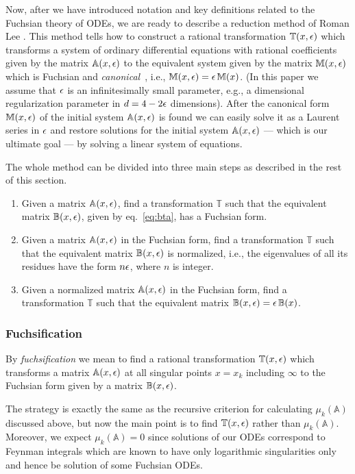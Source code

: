 \documentclass[12pt,a4paper]{article}
\def\M#1{\mathbb{#1}} %
\begin{document}
Now, after we have introduced notation and key definitions related to the Fuchsian theory of ODEs, we are ready to describe a reduction method of Roman Lee \cite{Lee15}.
This method tells how to construct a rational transformation $\M T(x,\eps)$ which transforms a system of ordinary differential equations with rational coefficients given by the matrix $\M A(x,\eps)$ to the equivalent system given by the matrix $\M M(x,\eps)$ which is Fuchsian and {\em canonical}~\cite{Henn13}, i.e., $\M M(x,\eps) = \eps\, \M M(x)$.
(In this paper we assume that $\epsilon$ is an infinitesimally small parameter, e.g., a dimensional regularization parameter in $d=4-2\epsilon$ dimensions).
After the canonical form $\M M(x,\eps)$ of the initial system $\M A(x,\eps)$ is found we can easily solve it as a Laurent series in $\epsilon$ and restore solutions for the initial system $\M A(x,\eps)$ --- which is our ultimate goal --- by solving a linear system of equations.

The whole method can be divided into three main steps as described in the rest of this section.

\begin{enumerate}
  \item Given a matrix $\M A(x,\eps)$, find a transformation $\M T$ such that the equivalent matrix $\M B(x,\eps)$, given by eq.~\eqref{eq:bta}, has a Fuchsian form.
  \item Given a matrix $\M A(x,\eps)$ in the Fuchsian form, find a transformation $\M T$ such that the equivalent matrix $\M B(x,\eps)$ is normalized, i.e., the eigenvalues of all its residues have the form $n \epsilon$, where $n$ is integer.
  \item Given a normalized matrix $\M A(x,\eps)$ in the Fuchsian form, find a transformation $\M T$ such that the equivalent matrix $\M B(x,\eps) = \eps \, \M B(x)$.
\end{enumerate}


\subsubsection{Fuchsification}
\label{sec:fuchs}

By {\em fuchsification} we mean to find a rational transformation $\M T(x,\eps)$ which transforms a matrix $\M A(x,\eps)$ at all singular points $x=x_k$ including $\infty$ to the Fuchsian form given by a matrix $\M B(x,\eps)$.

The strategy is exactly the same as the recursive criterion for calculating $\mu_k(\M A)$ discussed above, but now the main point is to find $\M T(x,\eps)$ rather than $\mu_k(\M A)$.
Moreover, we expect $\mu_k(\M A) = 0$ since solutions of our ODEs correspond to Feynman integrals which are known to have only logarithmic singularities only and hence be solution of some Fuchsian ODEs.
\end{document}
